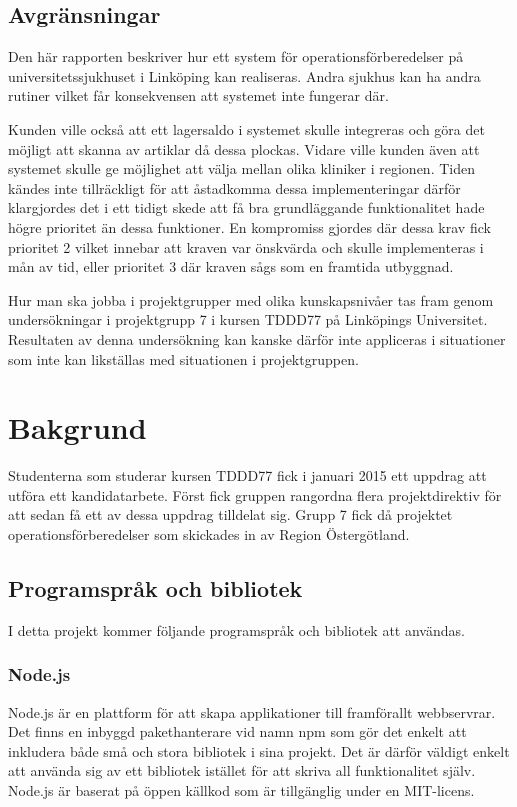 \documentclass{article}
\begin{document}
\subsection{Avgränsningar}
Den här rapporten beskriver hur ett system för operationsförberedelser på universitetssjukhuset i Linköping kan realiseras. Andra sjukhus kan ha andra rutiner vilket får konsekvensen att systemet inte fungerar där.

Kunden ville också att ett lagersaldo i systemet skulle integreras och göra det möjligt att skanna av artiklar då dessa plockas. Vidare ville kunden även att systemet skulle ge möjlighet att välja mellan olika kliniker i regionen. Tiden kändes inte tillräckligt för att åstadkomma dessa implementeringar därför klargjordes det i ett tidigt skede att få bra grundläggande funktionalitet hade högre prioritet än dessa funktioner. En kompromiss gjordes där dessa krav fick prioritet 2 vilket innebar att kraven var önskvärda och skulle implementeras i mån av tid, eller prioritet 3 där kraven sågs som en framtida utbyggnad.

Hur man ska jobba i projektgrupper med olika kunskapsnivåer tas fram genom undersökningar i projektgrupp 7 i kursen TDDD77 på Linköpings Universitet. Resultaten av denna undersökning kan kanske därför inte appliceras i situationer som inte kan likställas med situationen i projektgruppen.

\section{Bakgrund}
Studenterna som studerar kursen TDDD77 fick i januari 2015 ett uppdrag att utföra ett kandidatarbete. Först fick gruppen rangordna flera projektdirektiv för att sedan få ett av dessa uppdrag tilldelat sig. Grupp 7 fick då projektet operationsförberedelser som skickades in av Region Östergötland.

\subsection{Programspråk och bibliotek}
I detta projekt kommer följande programspråk och bibliotek att användas.

\subsubsection{Node.js}
Node.js är en plattform för att skapa applikationer till framförallt webbservrar. Det finns en inbyggd pakethanterare vid namn npm som gör det enkelt att inkludera både små och stora bibliotek i sina projekt. Det är därför väldigt enkelt att använda sig av ett bibliotek istället för att skriva all funktionalitet själv. Node.js är baserat på öppen källkod som är tillgänglig under en MIT-licens.
\end{document}
